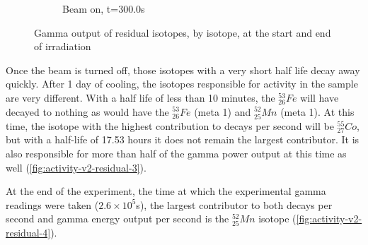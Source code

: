 \begin{figure}[htb]
\begin{subfigure}{0.49\textwidth}
  \caption{Beam on, t=300.0s}
  \label{fig:activity-v2-residual-2}
\end{subfigure}
\caption{Gamma output of residual isotopes, by isotope, at the start and end of irradiation}
\label{fig:activity-v2-residual-a}
\end{figure}

Once the beam is turned off, those isotopes with a very short half life decay away quickly.  After 1 day of cooling, the isotopes responsible for activity in the sample are very different.  With a half life of less than 10 minutes, the ${}^{53}_{26}Fe$ will have decayed to nothing as would have the ${}^{53}_{26}Fe$ (meta 1) and ${}^{52}_{25}Mn$ (meta 1).  At this time, the isotope with the highest contribution to decays per second will be ${}^{55}_{27}Co$, but with a half-life of 17.53 hours it does not remain the largest contributor.  It is also responsible for more than half of the gamma power output at this time as well (\ref{fig:activity-v2-residual-3}).

At the end of the experiment, the time at which the experimental gamma readings were taken ($2.6 \times 10^5$s), the largest contributor to both decays per second and gamma energy output per second is the ${}^{52}_{25}Mn$ isotope (\ref{fig:activity-v2-residual-4}).

